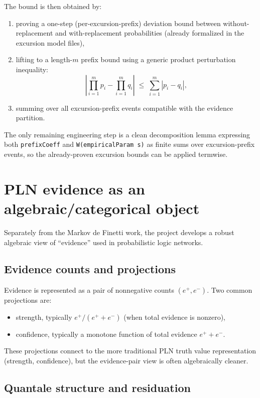 \documentclass[11pt]{article}
\newcommand{\1}{\mathbf{1}}
\begin{document}
The bound is then obtained by:
\begin{enumerate}[leftmargin=2em]
\item proving a one-step (per-excursion-prefix) deviation bound between without-replacement and with-replacement probabilities (already formalized in the excursion model files),
\item lifting to a length-$m$ prefix bound using a generic product perturbation inequality:
\[
\left|\prod_{i=1}^m p_i - \prod_{i=1}^m q_i\right|
\;\le\; \sum_{i=1}^m |p_i-q_i|,
\]
\item summing over all excursion-prefix events compatible with the evidence partition.
\end{enumerate}

The only remaining engineering step is a clean decomposition lemma expressing both \texttt{prefixCoeff} and \texttt{W(empiricalParam s)} as finite sums over excursion-prefix events, so the already-proven excursion bounds can be applied termwise.

\section{PLN evidence as an algebraic/categorical object}

Separately from the Markov de Finetti work, the project develops a robust algebraic view of ``evidence'' used in probabilistic logic networks.

\subsection{Evidence counts and projections}

Evidence is represented as a pair of nonnegative counts $(e^+,e^-)$.
Two common projections are:
\begin{itemize}[leftmargin=2em]
\item strength, typically $e^+/(e^++e^-)$ (when total evidence is nonzero),
\item confidence, typically a monotone function of total evidence $e^++e^-$.
\end{itemize}

These projections connect to the more traditional PLN truth value representation (strength, confidence), but the evidence-pair view is often algebraically cleaner.

\subsection{Quantale structure and residuation}
\end{document}
